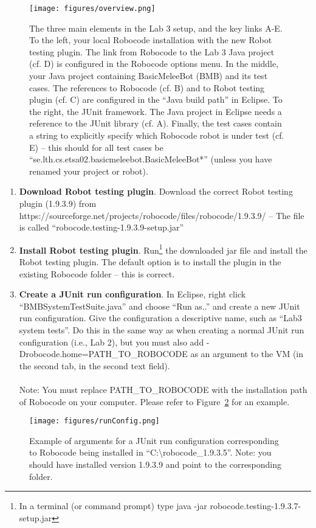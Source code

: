 \documentclass{scrreprt}
\begin{document}
\begin{figure}
\centering
\texttt{[image: figures/overview.png]}
\caption{The three main elements in the Lab 3 setup, and the key links A-E. To the left, your local Robocode installation with the new Robot testing plugin. The link from Robocode to the Lab 3 Java project (cf. D) is configured in the Robocode options menu. In the middle, your Java project containing BasicMeleeBot (BMB) and its test cases. The references to Robocode (cf. B) and to Robot testing plugin (cf. C) are configured in the ``Java build path'' in Eclipse. To the right, the JUnit framework. The Java project in Eclipse needs a reference to the JUnit library (cf. A). Finally, the test cases contain a string to explicitly specify which Robocode robot is under test (cf. E) -- this should for all test cases be ``se.lth.cs.etsa02.basicmeleebot.BasicMeleeBot*'' (unless you have renamed your project or robot).}
\label{fig:overview}
\end{figure}

\begin{enumerate}
\item \textbf{Download Robot testing plugin}. Download the correct Robot testing plugin (1.9.3.9) from https://sourceforge.net/projects/robocode/files/robocode/1.9.3.9/ -- The file is called ``robocode.testing-1.9.3.9-setup.jar''
\item \textbf{Install Robot testing plugin}. Run\footnote{In a terminal (or command prompt) type java -jar robocode.testing-1.9.3.7-setup.jar} the downloaded jar file and 
install the Robot testing plugin. The default option is to install the plugin in the existing Robocode folder -- this is correct.
\item \textbf{Create a JUnit run configuration}. In Eclipse, right click ``BMBSystemTestSuite.java'' and choose ``Run as..'' and create a new JUnit run configuration. Give the configuration a descriptive name, such as ``Lab3 system tests''. Do this in the same way as when creating a normal JUnit run configuration (i.e., Lab 2), but you must also add -Drobocode.home=PATH\_TO\_ROBOCODE as an argument to the VM (in the second tab, in the second text field).\\\\Note: You must replace PATH\_TO\_ROBOCODE with the installation path of Robocode on your computer. Please refer to Figure~\ref{fig:runConfig} for an example.
\end{enumerate}

\begin{figure}
\centering
\texttt{[image: figures/runConfig.png]}
\caption{Example of arguments for a JUnit run configuration corresponding to Robocode being installed in ``C:\textbackslash robocode\_1.9.3.5''. Note: you should have installed version 1.9.3.9 and point to the corresponding folder.}
\label{fig:runConfig}
\end{figure}
\end{document}
